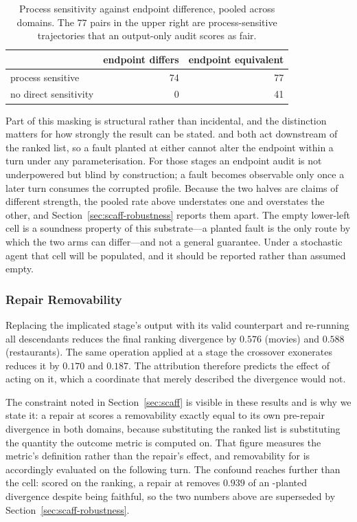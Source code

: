 \begin{table}[t]
  \caption{Process sensitivity against endpoint difference, pooled across domains. The $77$ pairs
    in the upper right are process-sensitive trajectories that an output-only audit scores as
    fair.}
  \label{tab:scaff-masking}
  \begin{tabular}{lrr}
    \toprule
     & endpoint differs & endpoint equivalent \\
    \midrule
    process sensitive        & 74 & 77 \\
    no direct sensitivity    &  0 & 41 \\
    \bottomrule
  \end{tabular}
\end{table}

Part of this masking is structural rather than incidental, and the distinction matters for how
strongly the result can be stated.  and  both act downstream of the
ranked list, so a fault planted at either cannot alter the endpoint within a turn under any
parameterisation. For those stages an endpoint audit is not underpowered but blind by
construction; a  fault becomes observable only once a later turn consumes the
corrupted profile. Because the two halves are claims of different strength, the pooled rate above
understates one and overstates the other, and Section~\ref{sec:scaff-robustness} reports them
apart. The empty lower-left cell is a soundness property of this substrate---a planted
fault is the only route by which the two arms can differ---and not a general guarantee. Under a
stochastic agent that cell will be populated, and it should be reported rather than assumed empty.

\subsubsection{Repair Removability}
\label{sec:scaff-repair}

Replacing the implicated stage's output with its valid counterpart and re-running all descendants
reduces the final ranking divergence by $0.576$ (movies) and $0.588$ (restaurants). The same
operation applied at a stage the crossover exonerates reduces it by $0.170$ and $0.187$. The
attribution therefore predicts the effect of acting on it, which a coordinate that merely
described the divergence would not.

The constraint noted in Section~\ref{sec:scaff} is visible in these results and is why we state
it: a repair at  scores a removability exactly equal to its own pre-repair divergence
in both domains, because substituting the ranked list is substituting the quantity the outcome
metric is computed on. That figure measures the metric's definition rather than the repair's
effect, and removability for  is accordingly evaluated on the following turn. The
confound reaches further than the  cell: scored on the ranking, a repair at
 removes $0.939$ of an -planted divergence despite 
being faithful, so the two numbers above are superseded by
Section~\ref{sec:scaff-robustness}.

